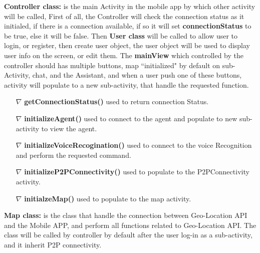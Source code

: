 \documentclass{scrreprt}
\begin{document}
     \textbf{Controller class:} is the main Activity in the mobile app by which other activity will be called,  First of all, the Controller will check the connection status as it initialed, if there is a connection available, if so it will set \textbf{connectionStatus} to be true, else it will be false. Then \textbf{User class} will be called to allow user to login, or register, then create user object, the user object will be used to display user info on the screen, or edit them.
The \textbf{mainView} which controlled by the controller should has multiple buttons, map ``initialized" by default on sub-Activity, chat, and the Assistant, and when a user push one of these buttons, activity will populate to a new sub-activity, that handle the requested function.

\begin{itemize}

\item[$\nabla$] \textbf{getConnectionStatus()} used to return connection Status.
\item[$\nabla$] \textbf{initializeAgent()} used to connect to the agent and populate to new sub-activity to view the agent.
\item[$\nabla$] \textbf{initializeVoiceRecogination()} used to connect to the voice Recognition and perform the requested command.
\item[$\nabla$] \textbf{initializeP2PConnectivity()} used to populate to the P2PConnectivity activity.
\item[$\nabla$] \textbf{initialzeMap()} used to populate to the map activity.
\end{itemize}


\textbf{Map class:} is the class that handle the connection between Geo-Location API and the Mobile APP, and perform all functions related to Geo-Location API.
The class will be called by controller by default after the user log-in as a sub-activity, and it inherit P2P connectivity.
\end{document}
